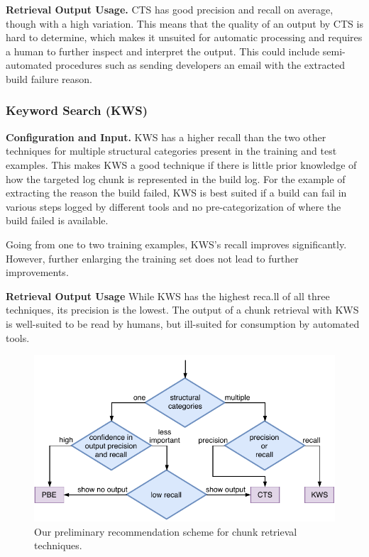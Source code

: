 \noindent
\textbf{Retrieval Output Usage.}
CTS has good precision and recall on average, though with a high
variation.
This means that the quality of an output by CTS is hard to
determine, which makes it unsuited for automatic  processing and requires
a human to further inspect and interpret the output.
This could include semi-automated procedures such as sending
developers an email with the extracted build failure reason.

\subsubsection{Keyword Search (KWS)}
\noindent
\textbf{Configuration and Input.}
KWS has a higher recall than the two other techniques for multiple
structural categories present in the training and test examples.
This
makes KWS a good technique if there is little prior knowledge of how
the targeted log chunk is represented in the build log.
For the
example of extracting the reason the build failed, KWS is best suited
if a build can fail in various steps logged by different tools and no
pre-categorization of where the build failed is available.

Going from one to two training examples, KWS's recall improves
significantly.
However, further enlarging the training set
does not lead to further improvements.

\noindent
\textbf{Retrieval Output Usage}
While KWS has the highest reca.ll of all three techniques, its
precision is the lowest.
The output of a chunk retrieval with KWS is
well-suited to be read by humans, but ill-suited for consumption by
automated tools.

\begin{figure}[tb]
		\centering
		\includegraphics[width=\columnwidth,
		clip]{img/crt-recommendation.pdf}
		\caption{Our preliminary recommendation scheme for chunk
		retrieval techniques.}
		\label{fig:crt-recommendation}
\end{figure}

